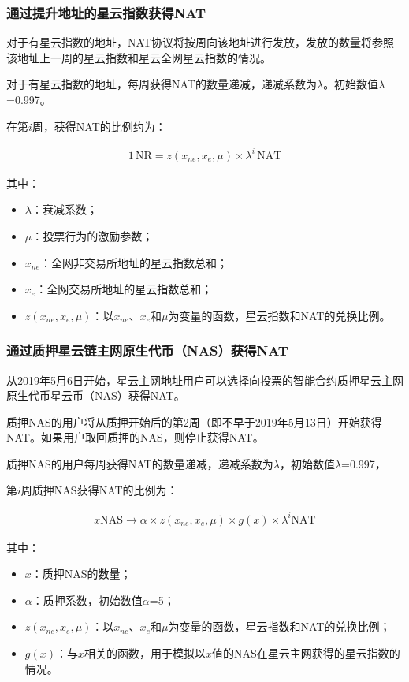 \subsubsection{通过提升地址的星云指数获得NAT}

对于有星云指数的地址，NAT协议将按周向该地址进行发放，发放的数量将参照该地址上一周的星云指数和星云全网星云指数的情况。

对于有星云指数的地址，每周获得NAT的数量递减，递减系数为$\lambda$。初始数值$\lambda$=0.997。

在第$i$周，获得NAT的比例约为：

\begin{align}
1\,\text{NR}=z(x_{ne},x_{e},\mu)\times\lambda^{i}\,\text{NAT}
\end{align} 

其中：
\begin{itemize}
	\item $\lambda$：衰减系数；
	\item $\mu$：投票行为的激励参数；
	\item $x_{ne}$：全网非交易所地址的星云指数总和；
	\item $x_{e}$：全网交易所地址的星云指数总和；
	\item $z(x_{ne},x_{e},\mu)$：以$x_{ne}$、$x_{e}$和$\mu$为变量的函数，星云指数和NAT的兑换比例。
\end{itemize}

\subsubsection{通过质押星云链主网原生代币（NAS）获得NAT}

从2019年5月6日开始，星云主网地址用户可以选择向投票的智能合约质押星云主网原生代币星云币（NAS）获得NAT。

质押NAS的用户将从质押开始后的第2周（即不早于2019年5月13日）开始获得NAT。如果用户取回质押的NAS，则停止获得NAT。

质押NAS的用户每周获得NAT的数量递减，递减系数为$\lambda$，初始数值$\lambda$=0.997，

第$i$周质押NAS获得NAT的比例为： 

\begin{align}
x \text{NAS} \rightarrow \alpha \times z(x_{ne},x_{e},\mu)\times g(x) \times \lambda^{i} \text{NAT}
\end{align}

其中：

\begin{itemize}
	\item $x$：质押NAS的数量；
	\item $\alpha$：质押系数，初始数值$\alpha$=5；
	\item $z(x_{ne},x_{e},\mu)$：以$x_{ne}$、$x_{e}$和$\mu$为变量的函数，星云指数和NAT的兑换比例；
	\item $g(x)$：与$x$相关的函数，用于模拟以$x$值的NAS在星云主网获得的星云指数的情况。
\end{itemize}

